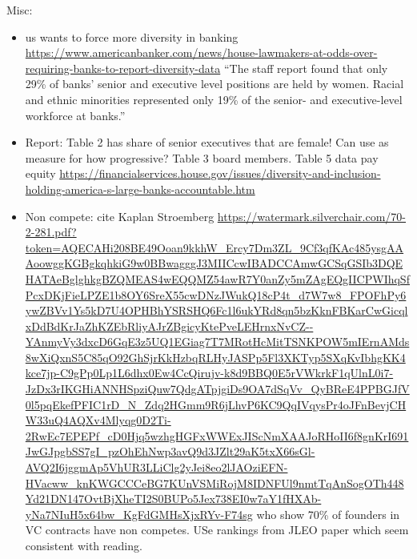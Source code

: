 Misc:
		\begin{itemize}
				
				
				\item us wants to force more diversity in banking
				\url{https://www.americanbanker.com/news/house-lawmakers-at-odds-over-requiring-banks-to-report-diversity-data}
				“The staff report found that only 29\% of banks' senior and executive level positions are held by women. Racial and ethnic minorities represented only 19\% of the senior- and executive-level workforce at banks.”
				
				\item  Report: Table 2 has share of senior executives that are female! Can use as measure for how progressive? Table 3 board members. Table 5 data pay equity
				\url{https://financialservices.house.gov/issues/diversity-and-inclusion-holding-america-s-large-banks-accountable.htm}
				
				\item Non compete: cite Kaplan Stroemberg \url{https://watermark.silverchair.com/70-2-281.pdf?token=AQECAHi208BE49Ooan9kkhW_Ercy7Dm3ZL_9Cf3qfKAc485ysgAAAoowggKGBgkqhkiG9w0BBwagggJ3MIICcwIBADCCAmwGCSqGSIb3DQEHATAeBglghkgBZQMEAS4wEQQMZ54awR7Y0anZy5mZAgEQgIICPWIhqSfPcxDKjFieLPZE1b8OY6SreX55cwDNzJWukQ18cP4t_d7W7w8_FPOFhPy6ywZBVv1Ys5kD7U4OPHBhYSRSHQ6Fc1l6ukYRd8qn5bzKknFBKarCwGicqlxDdBdKrJaZhKZEbRliyAJrZBgicyKtePveLEHrnxNvCZ--YAnmyVy3dxcD6GqE3z5UQ1EGiag7T7MRotHcMitTSNKPOW5mIErnAMds8wXiQxnS5C85qO92GhSjrKkHzbqRLHyJASPp5Fl3XKTyp5SXqKvIbhgKK4kce7jp-C9gPp0Lp1L6dhx0Ew4CcQirujv-k8d9BBQ0E5rVWkrkF1qUlnL0i7-JzDx3rIKGHiANNHSpziQuw7QdgATpjgiDs9OA7dSqVv_QyBReE4PPBGJfV0l5pqEkefPFIC1rD_N_Zdq2HGmm9R6jLhvP6KC9QqIVqysPr4oJFnBevjCHW33uQ4AQXv4Mlyqg0D2Ti-2RwEc7EPEPf_cD0Hjq5wzhgHGFxWWExJIScNmXAAJoRHoII6f8gnKrI691JwGJpgbSS7gI_pzOhEhNwp3avQ9d3JZlt29aK5txX66sGl-AVQ2I6jggmAp5VhUR3LLiClg2yJei8eo2lJAOziEFN-HVacww_knKWGCCCeBG7KUnVSMiRojM8IDNFUl9nmtTqAnSogOTh448Yd21DN147OvtBjXheTI2S0BUPo5Jex738EI0w7aY1fHXAb-yNa7NIuH5x64bw_KgFdGMHsXjxRYv-F74sg} who show 70\% of founders in VC contracts have non competes. USe rankings from JLEO paper which seem consistent with reading. 
				

\end{itemize}
